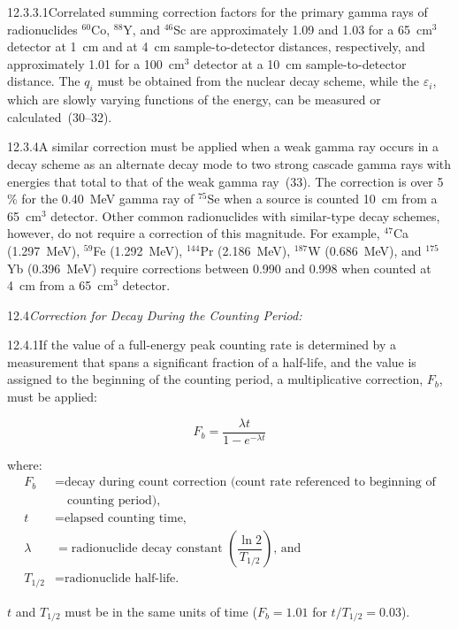 \documentclass[12pt]{article}
\begin{document}
12.3.3.1\quad Correlated summing correction factors for the primary gamma rays of
radionuclides $^{60}$Co, $^{88}$Y, and $^{46}$Sc are approximately 1.09 and 1.03 for a
65~cm$^3$ detector at 1~cm and at 4~cm sample-to-detector distances, respectively, and
approximately 1.01 for a 100~cm$^3$ detector at a 10~cm sample-to-detector distance. The
$q_i$ must be obtained from the nuclear decay scheme, while the $\varepsilon_i$, which
are slowly varying functions of the energy, can be measured or calculated~(30--32).

12.3.4\quad A similar correction must be applied when a weak gamma ray occurs in a decay
scheme as an alternate decay mode to two strong cascade gamma rays with energies that
total to that of the weak gamma ray~(33). The correction is over 5\,\% for the 0.40~MeV
gamma ray of $^{75}$Se when a source is counted 10~cm from a 65~cm$^3$ detector. Other
common radionuclides with similar-type decay schemes, however, do not require a
correction of this magnitude. For example, $^{47}$Ca (1.297~MeV), $^{59}$Fe (1.292~MeV),
$^{144}$Pr (2.186~MeV), $^{187}$W (0.686~MeV), and $^{175}$Yb (0.396~MeV) require
corrections between 0.990 and 0.998 when counted at 4~cm from a 65~cm$^3$ detector.

12.4\quad \textit{Correction for Decay During the Counting Period:}

12.4.1\quad If the value of a full-energy peak counting rate is determined by a
measurement that spans a significant fraction of a half-life, and the value is assigned
to the beginning of the counting period, a multiplicative correction, $F_b$, must be
applied:

\begin{equation}
  F_b = \frac{\lambda t}{1 - e^{-\lambda t}}
  \label{eq:decay_correction_begin}
\end{equation}

\noindent where:
\begin{align*}
  F_b      &= \text{decay during count correction (count rate referenced to beginning of}\\
           &\quad\text{counting period),}\\
  t        &= \text{elapsed counting time,}\\
  \lambda  &= \text{radionuclide decay constant }\!\left(\dfrac{\ln 2}{T_{1/2}}\right)\text{, and}\\
  T_{1/2}  &= \text{radionuclide half-life.}
\end{align*}

$t$ and $T_{1/2}$ must be in the same units of time ($F_b = 1.01$ for $t/T_{1/2} = 0.03$).
\end{document}
